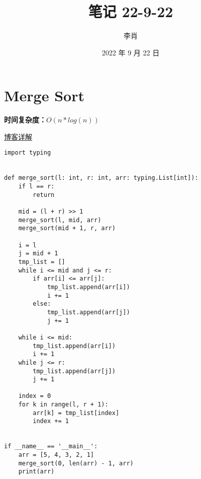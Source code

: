 \documentclass[UTF8]{ctexart}
\title{笔记 22-9-22}
\author{李肖}
\date{2022 年 9 月 22 日}
\begin{document}
\maketitle

\section{Merge Sort}
\textbf{时间复杂度：}$O(n*log(n))$

\href{https://blog.csdn.net/qq_41219157/article/details/124096439}{博客详解}

\begin{lstlisting}
import typing


def merge_sort(l: int, r: int, arr: typing.List[int]):
    if l == r:
        return

    mid = (l + r) >> 1
    merge_sort(l, mid, arr)
    merge_sort(mid + 1, r, arr)

    i = l
    j = mid + 1
    tmp_list = []
    while i <= mid and j <= r:
        if arr[i] <= arr[j]:
            tmp_list.append(arr[i])
            i += 1
        else:
            tmp_list.append(arr[j])
            j += 1

    while i <= mid:
        tmp_list.append(arr[i])
        i += 1
    while j <= r:
        tmp_list.append(arr[j])
        j += 1

    index = 0
    for k in range(l, r + 1):
        arr[k] = tmp_list[index]
        index += 1


if __name__ == '__main__':
    arr = [5, 4, 3, 2, 1]
    merge_sort(0, len(arr) - 1, arr)
    print(arr)

\end{lstlisting}
\end{document}

